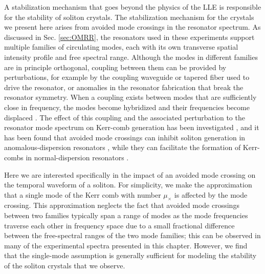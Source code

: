 A stabilization mechanism that goes beyond the physics of the LLE is responsible for the stability of soliton crystals. The stabilization mechanism for the crystals we present here arises from avoided mode crossings in the resonator spectrum. As discussed in Sec. \ref{sec:OMRR}, the resonators used in these experiments support multiple families of circulating modes, each with its own transverse spatial intensity profile and free spectral range. Although the modes in different families are in principle orthogonal, coupling between them can be provided by perturbations, for example by the coupling waveguide or tapered fiber used to drive the resonator, or anomalies in the resonator fabrication that break the resonator symmetry. When a coupling exists between modes that are sufficiently close in frequency, the modes become hybridized and their frequencies become displaced \cite{Haus1991}. The effect of this coupling and the associated perturbation to the resonator mode spectrum on Kerr-comb generation has been investigated \cite{Savchenkov2012}, and it has been found that avoided mode crossings can inhibit soliton generation in anomalous-dispersion resonators \cite{Herr2014a,Yi2015}, while they can facilitate the formation of Kerr-combs in normal-dispersion resonators \cite{Liu2014a,Xue2015,Bao2017}. 



Here we are interested specifically in the impact of an avoided mode crossing on the temporal waveform of a soliton. For simplicity, we make the approximation that a single mode of the Kerr comb with number $\mu_\times$ is affected by the mode crossing. This approximation neglects the fact that avoided mode crossings between two families typically span a range of modes as the mode frequencies traverse each other in frequency space due to a small fractional difference between the free-spectral ranges of the two mode families; this can be observed in many of the experimental spectra presented in this chapter. However, we find that the single-mode assumption is generally sufficient for modeling the stability of the soliton crystals that we observe.

